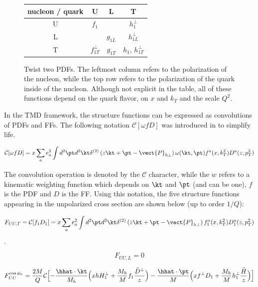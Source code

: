 \begin{figure}
	\centering
	\begin{tabular}{|c|c|c|c|}
		\hline 
		nucleon / quark & U & L & T \\
		\hline
		U & $f_1$ & & $h_1^{\perp}$ \\
		L & & $g_{1L}$ & $h_{1L}^{\perp}$ \\
		T & $f_{1T}^{\perp}$ & $g_{1T}$ & $h_1$, $h_{1T}^{\perp}$ \\ 
		\hline
	\end{tabular}
	\caption[Twist two PDFs]{Twist two PDFs.  The leftmost column refers to the polarization of the nucleon, while the top row refers to the polarization of the quark inside of the nucleon.  Although not explicit in the table, all of these functions depend on the quark flavor, on $x$ and $k_{T}$ and the scale $Q^2$.}
	\label{table:twist-two-pdfs}
\end{figure}

In the TMD framework, the structure functions can be expressed as convolutions of PDFs and FFs.  The following notation $\mathcal{C}[\omega f D]$ was introduced in \cite{tmds-bacchetta:2006} to simplify life.

\begin{equation}
  \mathcal{C}[\omega f D] = x \sum_{a} e^{2}_{a} \int d^{2}\pt d^{2}\kt \delta^{(2)} \left( z\kt + \pt - \vect{P}_{h\perp} \right) \omega (\kt, \pt) f^{a}(x, k_{T}^{2}) D^{a}(z, p_{T}^{2}) 
  \label{eqn:convolution}
\end{equation}

The convolution operation is denoted by the $\mathcal{C}$ character, while the $w$ refers to a kinematic weighting function which depends on $\kt$ and $\pt$ (and can be one), $f$ is the PDF and $D$ is the FF.  Using this notation, the five structure functions appearing in the unpolarized cross section are shown below (up to order $1/Q$):

\begin{equation}
F_{UU,T} = \mathcal{C}[f_1 D_1] = x \sum_{a} e^{2}_{a} \int d^{2} \pt d^{2} \kt \delta^{(2)} \left( z\kt + \pt - \vect{P}_{h\perp} \right) f_{1}^{a}(x, k_{T}^{2}) D_{1}^{a}(z, p_{T}^{2})
\end{equation}.

\begin{equation}
F_{UU,L} = 0
\end{equation}

\begin{equation}
  F_{UU}^{\cos \phi_h} = \frac{2M}{Q} \mathcal{C} \Bigl[ - \frac{\hhat \cdot \kt}{M_h} \Bigl( x h H_{1}^{\perp} + 
    \frac{M_h}{M} f_1 \frac{\tilde{D}^{\perp}}{z} \Bigr) -
    \frac{\hhat \cdot \pt}{M} \Bigl( x f^{\perp} D_1 + \frac{M_h}{M} h_1^{\perp} \frac{\tilde{H}}{z} \Bigr)\Bigr]
\end{equation}

